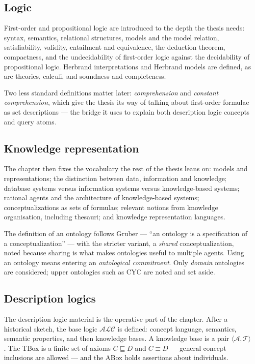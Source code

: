 \documentclass[11pt,a4paper,DIV=12,parskip=half]{scrartcl}
\newcommand{\ALC}{\ensuremath{\mathcal{ALC}}}
\newcommand{\Tbox}{\ensuremath{\mathcal{T}}}
\newcommand{\Abox}{\ensuremath{\mathcal{A}}}
\begin{document}
\subsection{Logic}

First-order and propositional logic are introduced to the depth the thesis
needs: syntax, semantics, relational structures, models and the model relation,
satisfiability, validity, entailment and equivalence, the deduction theorem,
compactness, and the undecidability of first-order logic against the
decidability of propositional logic. Herbrand interpretations and Herbrand
models are defined, as are theories, calculi, and soundness and completeness.

Two less standard definitions matter later: \emph{comprehension} and
\emph{constant comprehension}, which give the thesis its way of talking about
first-order formulae as set descriptions --- the bridge it uses to explain both
description logic concepts and query atoms.

\subsection{Knowledge representation}

The chapter then fixes the vocabulary the rest of the thesis leans on: models
and representations; the distinction between data, information and knowledge;
database systems versus information systems versus knowledge-based systems;
rational agents and the architecture of knowledge-based systems;
conceptualizations as sets of formulae; relevant notions from knowledge
organisation, including thesauri; and knowledge representation languages.

The definition of an ontology follows Gruber --- \enquote{an ontology is a
specification of a conceptualization} --- with the stricter variant, a
\emph{shared} conceptualization, noted because sharing is what makes ontologies
useful to multiple agents. Using an ontology means entering an \emph{ontological
commitment}. Only \emph{domain} ontologies are considered; upper ontologies such
as CYC are noted and set aside.

\subsection{Description logics}

The description logic material is the operative part of the chapter. After a
historical sketch, the base logic \ALC{} is defined: concept language, semantics,
semantic properties, and then knowledge bases. A knowledge base is a pair
$\langle \Abox, \Tbox \rangle$. The TBox is a finite set of axioms $C \sqsubseteq
D$ and $C \equiv D$ --- general concept inclusions are allowed --- and the ABox
holds assertions about individuals.
\end{document}
